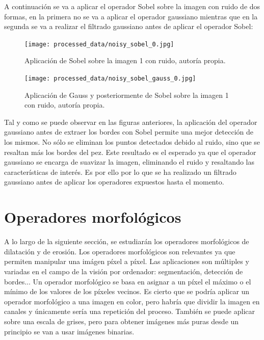 \documentclass[a4paper,12pt]{article}
\begin{document}
{\vspace{0.5cm}

A continuación se va a aplicar el operador Sobel sobre la imagen con ruido de dos formas, en la primera no se va a aplicar el operador gaussiano mientras 
que en la segunda se va a realizar el filtrado gaussiano antes de aplicar el operador Sobel:

\vspace{0.5cm}

\begin{figure}[H]
  \centering  
  \begin{minipage}[t]{0.4\textwidth}
    \centering
    \texttt{[image: processed\_data/noisy\_sobel\_0.jpg]}
    \caption{Aplicación de Sobel sobre la imagen 1 con ruido, autoría propia.}
    \label{fig:noisy-sobel}
  \end{minipage}
  \hspace{1.5cm}
  \centering
  \begin{minipage}[t]{0.4\textwidth}
    \centering
    \texttt{[image: processed\_data/noisy\_sobel\_gauss\_0.jpg]}
    \caption{Aplicación de Gauss y posteriormente de Sobel sobre la imagen 1 con ruido, autoría propia.}
    \label{fig:noisy-gaussian-sobel}
  \end{minipage}
\end{figure}

\vspace{0.5cm}

Tal y como se puede observar en las figuras anteriores, la aplicación del operador gaussiano antes de extraer los bordes con Sobel permite una mejor detección de los mismos.
No sólo se eliminan los puntos detectados debido al ruido, sino que se resaltan más los bordes del pez. Este resultado es el esperado ya que el operador gaussiano se encarga de
suavizar la imagen, eliminando el ruido y resaltando las características de interés. Es por ello por lo que se ha realizado un filtrado gaussiano antes de aplicar los operadores
expuestos hasta el momento.

\newpage

\section{Operadores morfológicos}

A lo largo de la siguiente sección, se estudiarán los operadores morfológicos de dilatación y de erosión. Los operadores morfológicos son relevantes ya que permiten manipular una imágen 
píxel a píxel. Las aplicaciones son múltiples y variadas en el campo de la visión por ordenador: segmentación, detección de bordes... Un operador morfológico se basa en asignar a un píxel 
el máximo o el mínimo de los valores de los píxeles vecinos. Es cierto que se podría aplicar un operador morfológico a una imagen en color, pero habría que dividir la imagen en canales y 
únicamente sería una repetición del proceso. También se puede aplicar sobre una escala de grises, pero para obtener imágenes más puras desde un principio se van a usar imágenes binarias.

}
\end{document}
